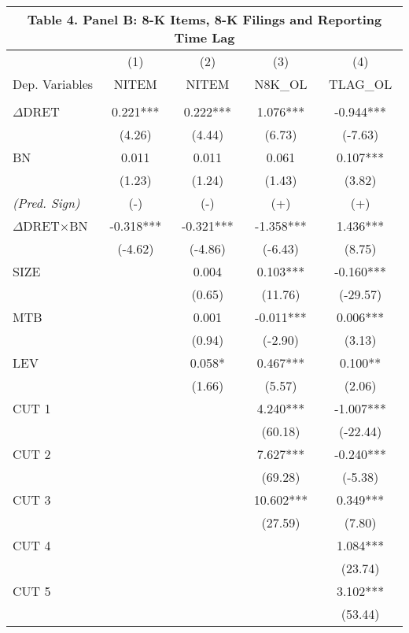 \begin{table}[H] \label{T4PB}%
	\begin{center}
		\begin{tabular}{lcccc}
			\multicolumn{5}{c}{\textbf{Table 4. Panel B: 8-K Items, 8-K Filings and Reporting Time Lag}} \\
			\midrule
			\midrule
			& (1) & (2) & (3) & (4) \\
			Dep. Variables & NITEM & NITEM & N8K\_OL & TLAG\_OL \\
			\midrule
			&   &   &   &  \\
			$\Delta$DRET & 0.221*** & 0.222*** & 1.076*** & -0.944*** \\
			& (4.26) & (4.44) & (6.73) & (-7.63) \\
			BN & 0.011 & 0.011 & 0.061 & 0.107*** \\
			& (1.23) & (1.24) & (1.43) & (3.82) \\
			\rowcolor[rgb]{ .933,  .925,  .882} \textit{(Pred. Sign)} & (-) & (-) & (+) & (+) \\
			\rowcolor[rgb]{ .933,  .925,  .882} $\Delta$DRET$\times$BN & -0.318*** & -0.321*** & -1.358*** & 1.436*** \\
			\rowcolor[rgb]{ .933,  .925,  .882}   & (-4.62) & (-4.86) & (-6.43) & (8.75) \\
			SIZE &   & 0.004 & 0.103*** & -0.160*** \\
			&   & (0.65) & (11.76) & (-29.57) \\
			MTB &   & 0.001 & -0.011*** & 0.006*** \\
			&   & (0.94) & (-2.90) & (3.13) \\
			LEV &   & 0.058* & 0.467*** & 0.100** \\
			&   & (1.66) & (5.57) & (2.06) \\
			CUT 1 &   &   & 4.240*** & -1.007*** \\
			&   &   & (60.18) & (-22.44) \\
			CUT 2 &   &   & 7.627*** & -0.240*** \\
			&   &   & (69.28) & (-5.38) \\
			CUT 3 &   &   & 10.602*** & 0.349*** \\
			&   &   & (27.59) & (7.80) \\
			CUT 4 &   &   &   & 1.084*** \\
			&   &   &   & (23.74) \\
			CUT 5 &   &   &   & 3.102*** \\
			&   &   &   & (53.44) \\

\end{tabular}
\end{center}
\end{table}
